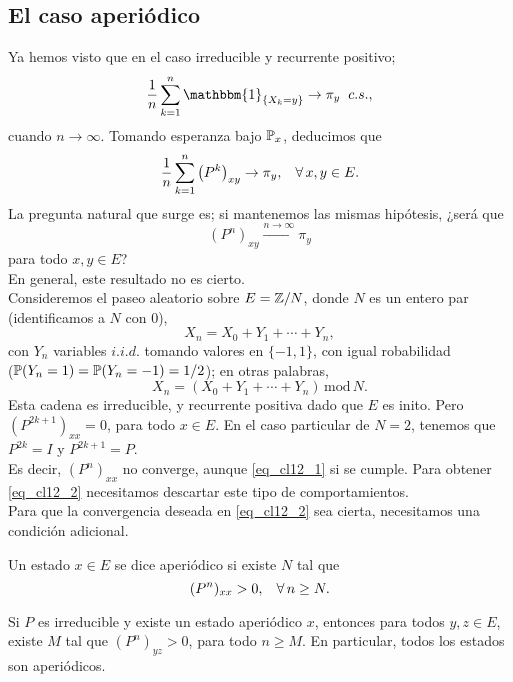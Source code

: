 \subsection{El caso aperiódico}
Ya hemos visto que en el caso irreducible y recurrente positivo;
\[\frac{1}{n}\sum_{k=1}^n\mathbbm{1}_{\{X_k = y\}}\rightarrow \pi_y\hspace{0.2cm}c.s.,\]
cuando $n\rightarrow \infty$. Tomando esperanza bajo $\mathbb{P}_x$, deducimos que
\begin{equation}
\frac{1}{n}\sum_{k=1}^n\left(P^k\right)_{xy}\rightarrow \pi_y,\hspace{0.3cm}\forall\,x,y\in E.
\label{eq_cl12_1}
\end{equation}
La pregunta natural que surge es; si mantenemos las mismas hipótesis, ¿será que
\begin{equation}
    (P^n)_{xy}\xrightarrow{n \rightarrow \infty}\pi_y
    \label{eq_cl12_2}
\end{equation}
para todo $x,y\in E$?\\ \newline
En general, este resultado no es cierto.\\ 

Consideremos el paseo aleatorio sobre $E = \mathbb Z/N$, donde $N$ es un entero par (identificamos a $N$ con 0),
\[X_n = X_0 + Y_1 + \cdots + Y_n,\]
con $Y_n$ variables $i.i.d.$ tomando valores en $\{-1,1\}$, con igual robabilidad \\($\mathbb{P}(Y_n = 1) = \mathbb{P}(Y_n=-1) = 1/2$); en otras palabras,
\[X_n = (X_0 + Y_1 + \cdots + Y_n)\,\text{mod}\,N.\]
Esta cadena es irreducible, y recurrente positiva dado que $E$ es inito. Pero $(P^{2k+1})_{xx}=0$, para todo $x\in E$. En el caso particular de $N=2$, tenemos que $P^{2k} = I$ y $P^{2k+1} = P$.\\ Es decir, $(P^n)_{xx}$ no converge, aunque \ref{eq_cl12_1} si se cumple. Para obtener \ref{eq_cl12_2} necesitamos descartar este tipo de comportamientos.\\ \newline
Para que la convergencia deseada en \ref{eq_cl12_2} sea cierta, necesitamos una condición adicional.
\begin{definicion}
Un estado $x\in E$ se dice aperiódico si existe $N$ tal que 
\[(P^n)_{xx}>0,\hspace{0.3cm}\forall\,n\geq N.\]
\end{definicion}
\begin{lem}
Si $P$ es irreducible y existe un estado aperiódico $x$, entonces para todos $y,z \in E$, existe $M$ tal que $(P^n)_{yz} >0$, para todo $n\geq M$. En particular, todos los estados son aperiódicos.
\end{lem}

